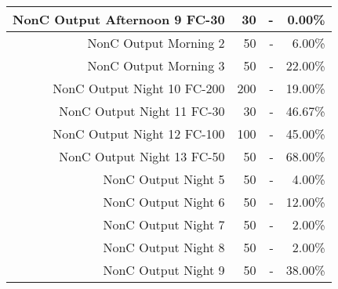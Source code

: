 \begin{longtable}{|r|r|r|r|}
    \hline
    NonC Output Afternoon 9 FC-30 & 30    & -     & 0.00\% \bigstrut\\
    \hline
    NonC Output Morning 2 & 50    & -     & 6.00\% \bigstrut\\
    \hline
    NonC Output Morning 3 & 50    & -     & 22.00\% \bigstrut\\
    \hline
    NonC Output Night 10 FC-200 & 200   & -     & 19.00\% \bigstrut\\
    \hline
    NonC Output Night 11 FC-30 & 30    & -     & 46.67\% \bigstrut\\
    \hline
    NonC Output Night 12 FC-100 & 100   & -     & 45.00\% \bigstrut\\
    \hline
    NonC Output Night 13 FC-50 & 50    & -     & 68.00\% \bigstrut\\
    \hline
    NonC Output Night 5 & 50    & -     & 4.00\% \bigstrut\\
    \hline
    NonC Output Night 6 & 50    & -     & 12.00\% \bigstrut\\
    \hline
    NonC Output Night 7 & 50    & -     & 2.00\% \bigstrut\\
    \hline
    NonC Output Night 8 & 50    & -     & 2.00\% \bigstrut\\
    \hline
    NonC Output Night 9 & 50    & -     & 38.00\% \bigstrut\\
    \hline
    \end{longtable}